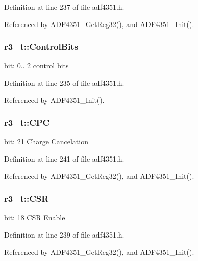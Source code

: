 Definition at line 237 of file adf4351.\+h.



Referenced by A\+D\+F4351\+\_\+\+Get\+Reg32(), and A\+D\+F4351\+\_\+\+Init().

\subsubsection[{\texorpdfstring{Control\+Bits}{ControlBits}}]{ r3\+\_\+t\+::\+Control\+Bits}\hypertarget{structr3__t_a4d5d480a6e629c07e0bb5575fb0023bb}{}\label{structr3__t_a4d5d480a6e629c07e0bb5575fb0023bb}
bit\+: 0.. 2 control bits 

Definition at line 235 of file adf4351.\+h.



Referenced by A\+D\+F4351\+\_\+\+Init().

\subsubsection[{\texorpdfstring{C\+PC}{CPC}}]{ r3\+\_\+t\+::\+C\+PC}\hypertarget{structr3__t_a61a4e7b02af2c11e18e823eac349fabf}{}\label{structr3__t_a61a4e7b02af2c11e18e823eac349fabf}
bit\+: 21 Charge Cancelation 

Definition at line 241 of file adf4351.\+h.



Referenced by A\+D\+F4351\+\_\+\+Get\+Reg32(), and A\+D\+F4351\+\_\+\+Init().

\subsubsection[{\texorpdfstring{C\+SR}{CSR}}]{ r3\+\_\+t\+::\+C\+SR}\hypertarget{structr3__t_a295a90a5720da8b88db8bf1420c806e2}{}\label{structr3__t_a295a90a5720da8b88db8bf1420c806e2}
bit\+: 18 C\+SR Enable 

Definition at line 239 of file adf4351.\+h.



Referenced by A\+D\+F4351\+\_\+\+Get\+Reg32(), and A\+D\+F4351\+\_\+\+Init().

